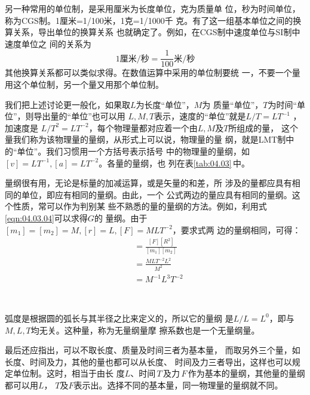 另一种常用的单位制，是采用厘米为长度单位，克为质量单
位，秒为时间单位，称为CGS制。1厘米=1/100米，1克=1/1000千
克。有了这一组基本单位之间的换算关系，导出单位的换算关系
也就确定了。例如，在CGS制中速度单位与SI制中速度单位之
间的关系为\vspace{-0.56em}
\begin{equation*}
  1 \text{厘米/秒} = \frac { 1 } { 1 0 0 } \text{米/秒}
\end{equation*}
其他换算关系都可以类似求得。在数值运算中采用的单位制要统
一，不要一个量用这个单位制，另一个量又用那个单位制。

我们把上述讨论更一般化，如果取$ L $为长度“单位”，$ M $为
质量“单位”，$ T $为时间“单位”，则导出量的“单位”也可以用
$ L , M , T $表示，速度的“单位”就是$ L / T = L T ^ { - 1 } $ ，加速度是
$ L / T ^ { 2 } = L T ^ { - 2 } $，每个物理量都对应着一个由$ L , M $及$ T $所组成的量，
这个量我们称为该物理量的量纲，从形式上可以说，物理量的量
纲，就是LMT制中的“单位”。我们习惯用一个方括号表示括号
中的物理量的量纲，如$ [ v ] = L T ^ { - 1 } , [ a ] = L T ^ { - 2 }$。各量的量纲，也
列在表\ref{tab:04.03}\,中。

量纲很有用，无论是标量的加减运算，或是矢量的和差，所
涉及的量都应具有相同的单位，即应有相同的量纲。由此，一个
公式两边的量应具有相同的量纲。这个性质，常可以作为判别某
些不熟悉的量的量纲的方法。例如，利用式\eqref{eqn:04.03.04}可以求得$ G $的
量纲。由于$ [ m _ { 1 } ] = [ m _ { 2 } ] = M , [ r ] = L , [  F ] = M L T ^ { - 2 } $，要求式两
边的量纲相同，可得：
\begin{align*}
  [ G ] & = \frac { [ F ] [ R ^ 2] } { [ m _ { 1 } ] [ m _ { 2 } ] } \\
        & = \frac { M L T ^ { - 2 } L ^ { 2 } } { M ^ { 2 } }        \\
        & = M ^ { - 1 } L ^ { 3 } T ^ { - 2 }
\end{align*}

~ \vspace{-2em}

弧度是根据圆的弧长与其半径之比来定义的，所以它的量纲
是$ L / L = L ^ { 0 } $，即与$ M , L , T $均无关。这种量，称为无量纲量摩
擦系数也是一个无量纲量。

最后还应指出，可以不取长度、质量及时间三者为基本量，
而取另外三个量，如长度、时间及力，其他的量也都可以从长度、
时间及力三者导出，这样也可以规定单位制。这时，相当于由长
度$ L $、\!时间\,$ T $\,及力\,$ F $\,作为基本的量纲，其他量的量纲都可以用$ L $，
$ T $及$ F $表示出。选择不同的基本量，同一物理量的量纲就不同。
